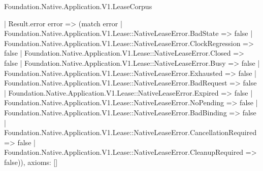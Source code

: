 \begin{lexlean}{Foundation.Native.Application.V1.LeaseCorpus}
\begin{semanticmodule}
{    | Result.error error => (match error
      | Foundation.Native.Application.V1.Lease::NativeLeaseError.BadState => false
      | Foundation.Native.Application.V1.Lease::NativeLeaseError.ClockRegression => false
      | Foundation.Native.Application.V1.Lease::NativeLeaseError.Closed => false
      | Foundation.Native.Application.V1.Lease::NativeLeaseError.Busy => false
      | Foundation.Native.Application.V1.Lease::NativeLeaseError.Exhausted => false
      | Foundation.Native.Application.V1.Lease::NativeLeaseError.BadRequest => false
      | Foundation.Native.Application.V1.Lease::NativeLeaseError.Expired => false
      | Foundation.Native.Application.V1.Lease::NativeLeaseError.NoPending => false
      | Foundation.Native.Application.V1.Lease::NativeLeaseError.BadBinding => false
      | Foundation.Native.Application.V1.Lease::NativeLeaseError.CancellationRequired => false
      | Foundation.Native.Application.V1.Lease::NativeLeaseError.CleanupRequired => false)),
  axioms: []
}


\end{semanticmodule}
\end{lexlean}
